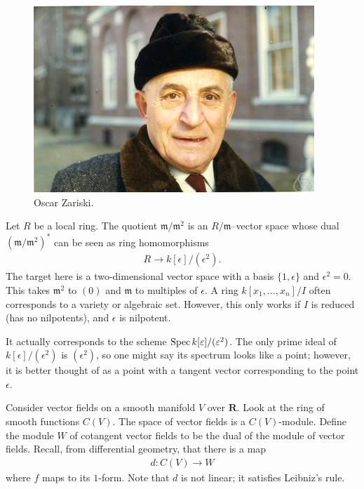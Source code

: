 \documentclass [11 pt, oneside, margin = 1 in] {article}
\begin{document}
\begin{figure}
\begin{center}
\includegraphics[scale=0.8]{images/zariski}
\caption{Oscar Zariski.}
\end{center}
\end{figure}


Let $R$ be a local ring. The quotient $\mathfrak{m}/\mathfrak{m}^2$ is an $R/\mathfrak{m}$--vector space whose dual $(\mathfrak{m}/\mathfrak{m}^2) ^*$ can be seen as ring homomorphisms 
\begin{align*}
	R\longrightarrow k[\epsilon]/(\epsilon^2).
\end{align*}
The target here is a two-dimensional vector space with a basis $\{1,\epsilon\}$ and $\epsilon^2=0$. This takes $\mathfrak{m}^2$ to $(0)$ and $\mathfrak{m}$ to multiples of $\epsilon$. A ring $k[x_1,\hdots, x_n]/I$ often corresponds to a variety or algebraic set. However, this only works if $I$ is reduced (has no nilpotents), and $\epsilon$ is nilpotent. 

It actually corresponds to the scheme $\operatorname{Spec} k[\varepsilon]/(\varepsilon^2)$. The only prime ideal of $k[\epsilon]/(\epsilon^2)$ is $(\epsilon^2)$, so one might say its spectrum looks like a point; however, it is better thought of as a point with a tangent vector corresponding to the point $\epsilon$.

Consider vector fields on a smooth manifold $V$ over $\mathbf{R}$. Look at the ring of smooth functions $C(V)$. The space of vector fields is a $C(V)$-module. Define the module $W$ of cotangent vector fields to be the dual of the module of vector fields. Recall, from differential geometry, that there is a map
\begin{align*}
	d:C(V) \longrightarrow W
\end{align*}
where $f$ maps to its $1$-form. Note that $d$ is not linear; it satisfies Leibniz's rule. 
\end{document}
